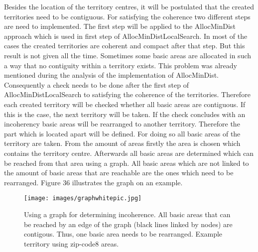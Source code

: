 Besides the location of the territory centres, it will be postulated that the created territories need to be contiguous. For satisfying the coherence two different steps are need to implemented. The first step will be applied to the AllocMinDist approach which is used in first step of AllocMinDistLocalSearch. In most of the cases the created territories are coherent and compact after that step. But this result is not given all the time. Sometimes some basic areas are allocated in such a way that no contiguity within a territory exists. This problem was already mentioned during the analysis of the implementation of AllocMinDist. Consequently a check needs to be done after the first step of AllocMinDistLocalSearch to satisfying the coherence of the territories. Therefore each created territory will be checked whether all basic areas are contiguous. If this is the case, the next territory will be taken. If the check concludes with an incoherency basic areas will be rearranged to another territory. Therefore the part which is located apart will be defined. For doing so all basic areas of the territory are taken. From the amount of areas firstly the area is chosen which contains the territory centre. Afterwards all basic areas are determined which can be reached from that area using a graph. All basic areas which are not linked to the amount of basic areas that are reachable are the ones which need to be rearranged. Figure 36 illustrates the graph on an example.

\begin{figure}[H]
	\centering
	\texttt{[image: images/graphwhitepic.jpg]}
	\caption[Using a graph for determining incoherence]{Using a graph for determining incoherence. All basic areas that can be reached by an edge of the graph (black lines linked by nodes) are contigous. Thus, one basic area needs to be rearranged. Example territory using zip-code8 areas.}
\end{figure}

